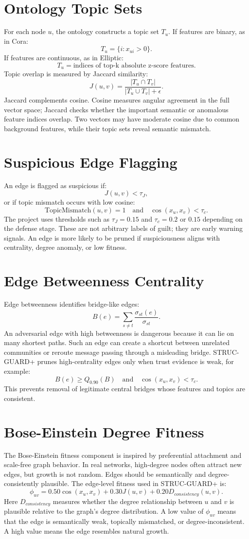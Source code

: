 \documentclass[12pt,oneside]{report}
\begin{document}
\section{Ontology Topic Sets}
For each node $u$, the ontology constructs a topic set $T_u$. If features are binary, as in Cora:
$$
T_u=\{i:x_{ui}>0\}.
$$
If features are continuous, as in Elliptic:
$$
T_u=\text{indices of top-k absolute z-score features}.
$$
Topic overlap is measured by Jaccard similarity:
$$
J(u,v)=\frac{|T_u\cap T_v|}{|T_u\cup T_v|+\epsilon}.
$$
Jaccard complements cosine. Cosine measures angular agreement in the full vector space; Jaccard checks whether the important semantic or anomalous feature indices overlap. Two vectors may have moderate cosine due to common background features, while their topic sets reveal semantic mismatch.

\section{Suspicious Edge Flagging}
An edge is flagged as suspicious if:
$$
J(u,v)<\tau_J,
$$
or if topic mismatch occurs with low cosine:
$$
\text{TopicMismatch}(u,v)=1\quad\text{and}\quad \cos(x_u,x_v)<\tau_c.
$$
The project uses thresholds such as $\tau_J=0.15$ and $\tau_c=0.2$ or $0.15$ depending on the defense stage. These are not arbitrary labels of guilt; they are early warning signals. An edge is more likely to be pruned if suspiciousness aligns with centrality, degree anomaly, or low fitness.

\section{Edge Betweenness Centrality}
Edge betweenness identifies bridge-like edges:
$$
B(e)=\sum_{s\neq t}\frac{\sigma_{st}(e)}{\sigma_{st}}.
$$
An adversarial edge with high betweenness is dangerous because it can lie on many shortest paths. Such an edge can create a shortcut between unrelated communities or reroute message passing through a misleading bridge. STRUC-GUARD+ prunes high-centrality edges only when trust evidence is weak, for example:
$$
B(e)\geq Q_{0.90}(B)\quad\text{and}\quad \cos(x_u,x_v)<\tau_c.
$$
This prevents removal of legitimate central bridges whose features and topics are consistent.

\section{Bose-Einstein Degree Fitness}
The Bose-Einstein fitness component is inspired by preferential attachment and scale-free graph behavior. In real networks, high-degree nodes often attract new edges, but growth is not random. Edges should be semantically and degree-consistently plausible. The edge-level fitness used in STRUC-GUARD+ is:
$$
\phi_{uv}=0.50\cos(x_u,x_v)+0.30J(u,v)+0.20D_{consistency}(u,v).
$$
Here $D_{consistency}$ measures whether the degree relationship between $u$ and $v$ is plausible relative to the graph's degree distribution. A low value of $\phi_{uv}$ means that the edge is semantically weak, topically mismatched, or degree-inconsistent. A high value means the edge resembles natural growth.
\end{document}
